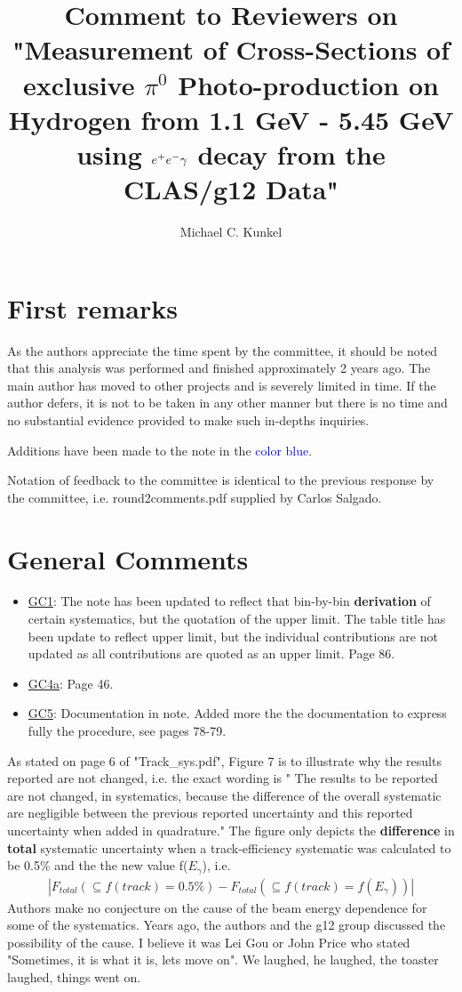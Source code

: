 \documentclass[11pt,a4paper]{article}
\author{Michael C. Kunkel}
\date{}
\title{Comment to Reviewers on "Measurement of Cross-Sections of exclusive $\pi^{0}$ Photo-production on Hydrogen from 1.1 GeV - 5.45 GeV using $\lowercase{e}^{+}\lowercase{e}^{-}\gamma$ decay from the CLAS/g12 Data"}
\begin{document}
\maketitle
\section{First remarks}
As the authors appreciate the time spent by the committee, it should be noted that this analysis was performed and finished approximately 2 years ago.  The main author has moved to other projects and is severely limited in time. If the author defers, it is not to be taken in any other manner but there is no time and no substantial evidence provided to make such in-depths inquiries.

Additions have been made to the note in the \textcolor{blue}{color blue}.

Notation of feedback to the committee is identical to the previous response by the committee, i.e. round2comments.pdf supplied by Carlos Salgado.
\section{General Comments}
\begin{itemize}
	\item \underline{GC1}: The note has been updated to reflect that bin-by-bin \textbf{derivation} of certain systematics, but the quotation of the upper limit. The table title has been update to reflect upper limit, but the individual contributions are not updated as all contributions are quoted as an upper limit. Page 86.
	\item \underline{GC4a}: Page 46.
	\item \underline{GC5}: Documentation in note. Added more the the documentation to express fully the procedure, see pages 78-79.
\end{itemize}
As stated on page 6 of "Track\_sys.pdf", Figure 7 is to illustrate why the results reported are not changed, i.e. the exact wording is " The results to be reported are not changed, in systematics, because the difference of the overall systematic are negligible between the previous reported uncertainty and this reported uncertainty when added in quadrature."  The figure only depicts the \textbf{difference} in \textbf{total} systematic uncertainty when a track-efficiency systematic was calculated to be 0.5\% and the the new value f($E_{\gamma}$), i.e.
\begin{align}
\left| F_{total}( \subseteq f(track) = 0.5\%) - F_{total}( \subseteq f(track) = f(E_{\gamma})) \nonumber \right |
\end{align}
Authors make no conjecture on the cause of the beam energy dependence for some of the systematics. Years ago, the authors and the g12 group discussed the possibility of the cause. I believe it was Lei Gou or John Price who stated "Sometimes, it is what it is, lets move on". We laughed, he laughed, the toaster laughed, things went on.
\end{document}
